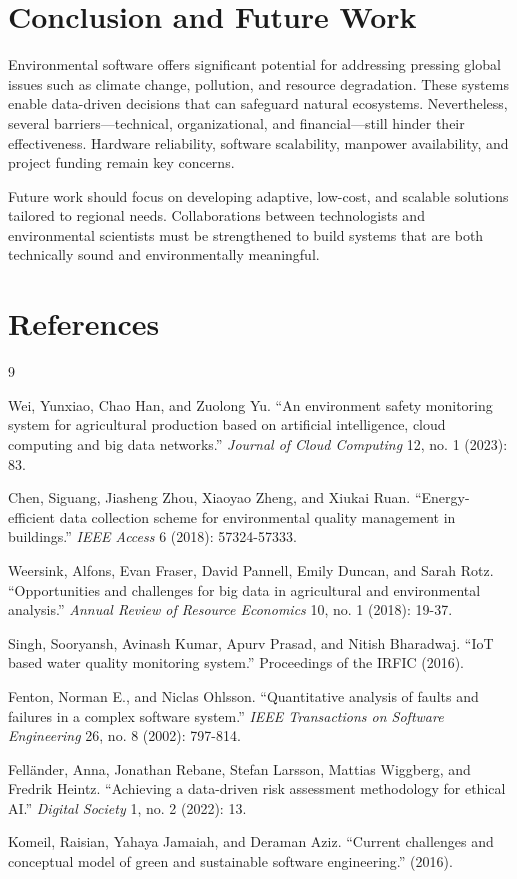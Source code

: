 \documentclass[12pt, a4paper]{article} %
\begin{document}
\section{Conclusion and Future Work}
Environmental software offers significant potential for addressing pressing global issues such as climate change, pollution, and resource degradation. These systems enable data-driven decisions that can safeguard natural ecosystems. Nevertheless, several barriers—technical, organizational, and financial—still hinder their effectiveness. Hardware reliability, software scalability, manpower availability, and project funding remain key concerns. 

Future work should focus on developing adaptive, low-cost, and scalable solutions tailored to regional needs. Collaborations between technologists and environmental scientists must be strengthened to build systems that are both technically sound and environmentally meaningful.


\section{References}

\begin{thebibliography}{9}

Wei, Yunxiao, Chao Han, and Zuolong Yu. ``An environment safety monitoring system for agricultural production based on artificial intelligence, cloud computing and big data networks.'' \textit{Journal of Cloud Computing} 12, no. 1 (2023): 83.

Chen, Siguang, Jiasheng Zhou, Xiaoyao Zheng, and Xiukai Ruan. ``Energy-efficient data collection scheme for environmental quality management in buildings.'' \textit{IEEE Access} 6 (2018): 57324-57333.

Weersink, Alfons, Evan Fraser, David Pannell, Emily Duncan, and Sarah Rotz. ``Opportunities and challenges for big data in agricultural and environmental analysis.'' \textit{Annual Review of Resource Economics} 10, no. 1 (2018): 19-37.

Singh, Sooryansh, Avinash Kumar, Apurv Prasad, and Nitish Bharadwaj. ``IoT based water quality monitoring system.'' Proceedings of the IRFIC (2016).

Fenton, Norman E., and Niclas Ohlsson. ``Quantitative analysis of faults and failures in a complex software system.'' \textit{IEEE Transactions on Software Engineering} 26, no. 8 (2002): 797-814.

Felländer, Anna, Jonathan Rebane, Stefan Larsson, Mattias Wiggberg, and Fredrik Heintz. ``Achieving a data-driven risk assessment methodology for ethical AI.'' \textit{Digital Society} 1, no. 2 (2022): 13.

Komeil, Raisian, Yahaya Jamaiah, and Deraman Aziz. ``Current challenges and conceptual model of green and sustainable software engineering.'' (2016).

\end{thebibliography}
\end{document}
